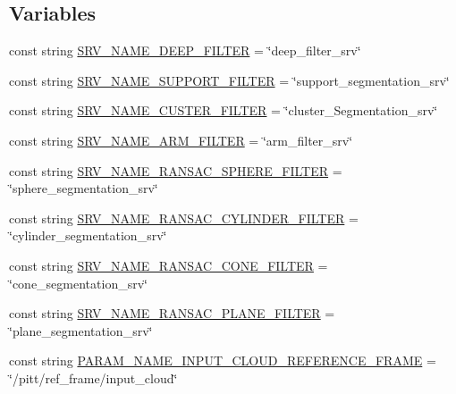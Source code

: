 \subsection*{Variables}
\begin{DoxyCompactItemize}
\item 
const string \hyperlink{namespacesrvm_aef26ae8da6e703be7bbc1fc319fc18d5}{S\-R\-V\-\_\-\-N\-A\-M\-E\-\_\-\-D\-E\-E\-P\-\_\-\-F\-I\-L\-T\-E\-R} = \char`\"{}deep\-\_\-filter\-\_\-srv\char`\"{}
\item 
const string \hyperlink{namespacesrvm_a326e9454009b64e7e5bac20f050ff129}{S\-R\-V\-\_\-\-N\-A\-M\-E\-\_\-\-S\-U\-P\-P\-O\-R\-T\-\_\-\-F\-I\-L\-T\-E\-R} = \char`\"{}support\-\_\-segmentation\-\_\-srv\char`\"{}
\item 
const string \hyperlink{namespacesrvm_af1af7e755b5eb874d7bc4fec3d6585b2}{S\-R\-V\-\_\-\-N\-A\-M\-E\-\_\-\-C\-U\-S\-T\-E\-R\-\_\-\-F\-I\-L\-T\-E\-R} = \char`\"{}cluster\-\_\-\-Segmentation\-\_\-srv\char`\"{}
\item 
const string \hyperlink{namespacesrvm_ac0600b046091267fd4d0aed25786961f}{S\-R\-V\-\_\-\-N\-A\-M\-E\-\_\-\-A\-R\-M\-\_\-\-F\-I\-L\-T\-E\-R} = \char`\"{}arm\-\_\-filter\-\_\-srv\char`\"{}
\item 
const string \hyperlink{namespacesrvm_affa682d6f49c99cbf55802194970b5e5}{S\-R\-V\-\_\-\-N\-A\-M\-E\-\_\-\-R\-A\-N\-S\-A\-C\-\_\-\-S\-P\-H\-E\-R\-E\-\_\-\-F\-I\-L\-T\-E\-R} = \char`\"{}sphere\-\_\-segmentation\-\_\-srv\char`\"{}
\item 
const string \hyperlink{namespacesrvm_ae5db0900b3766ce489c65d143ae595b6}{S\-R\-V\-\_\-\-N\-A\-M\-E\-\_\-\-R\-A\-N\-S\-A\-C\-\_\-\-C\-Y\-L\-I\-N\-D\-E\-R\-\_\-\-F\-I\-L\-T\-E\-R} = \char`\"{}cylinder\-\_\-segmentation\-\_\-srv\char`\"{}
\item 
const string \hyperlink{namespacesrvm_af2812968f812d475d50a80635965779d}{S\-R\-V\-\_\-\-N\-A\-M\-E\-\_\-\-R\-A\-N\-S\-A\-C\-\_\-\-C\-O\-N\-E\-\_\-\-F\-I\-L\-T\-E\-R} = \char`\"{}cone\-\_\-segmentation\-\_\-srv\char`\"{}
\item 
const string \hyperlink{namespacesrvm_ab0f0109239fb85cfb303e5f44e4534f2}{S\-R\-V\-\_\-\-N\-A\-M\-E\-\_\-\-R\-A\-N\-S\-A\-C\-\_\-\-P\-L\-A\-N\-E\-\_\-\-F\-I\-L\-T\-E\-R} = \char`\"{}plane\-\_\-segmentation\-\_\-srv\char`\"{}
\item 
const string \hyperlink{namespacesrvm_ac5228e86d6d396c944b11f847746b3b8}{P\-A\-R\-A\-M\-\_\-\-N\-A\-M\-E\-\_\-\-I\-N\-P\-U\-T\-\_\-\-C\-L\-O\-U\-D\-\_\-\-R\-E\-F\-E\-R\-E\-N\-C\-E\-\_\-\-F\-R\-A\-M\-E} = \char`\"{}/pitt/ref\-\_\-frame/input\-\_\-cloud\char`\"{}

\end{DoxyCompactItemize}
